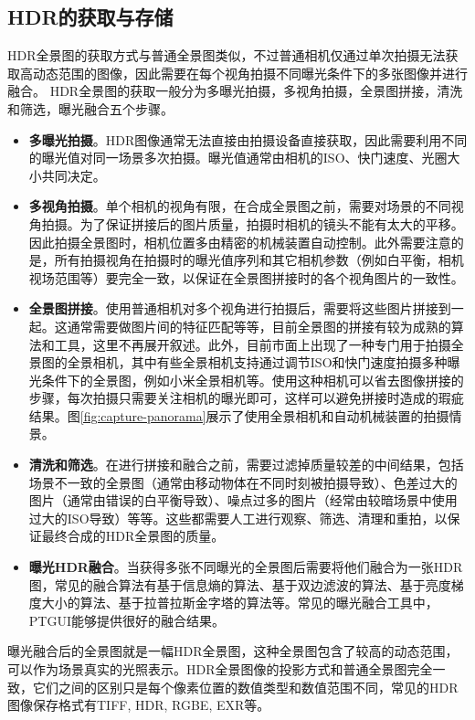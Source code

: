 \subsection{HDR的获取与存储}
HDR全景图的获取方式与普通全景图类似，不过普通相机仅通过单次拍摄无法获取高动态范围的图像，因此需要在每个视角拍摄不同曝光条件下的多张图像并进行融合。
HDR全景图的获取一般分为多曝光拍摄，多视角拍摄，全景图拼接，清洗和筛选，曝光融合五个步骤。
\begin{itemize}
    \item \textbf{多曝光拍摄}。HDR图像通常无法直接由拍摄设备直接获取，因此需要利用不同的曝光值对同一场景多次拍摄。曝光值通常由相机的ISO、快门速度、光圈大小共同决定。
    \item \textbf{多视角拍摄}。单个相机的视角有限，在合成全景图之前，需要对场景的不同视角拍摄。为了保证拼接后的图片质量，拍摄时相机的镜头不能有太大的平移。因此拍摄全景图时，相机位置多由精密的机械装置自动控制。此外需要注意的是，所有拍摄视角在拍摄时的曝光值序列和其它相机参数（例如白平衡，相机视场范围等）要完全一致，以保证在全景图拼接时的各个视角图片的一致性。
    \item \textbf{全景图拼接}。使用普通相机对多个视角进行拍摄后，需要将这些图片拼接到一起。这通常需要做图片间的特征匹配等等，目前全景图的拼接有较为成熟的算法和工具，这里不再展开叙述。此外，目前市面上出现了一种专门用于拍摄全景图的全景相机，其中有些全景相机支持通过调节ISO和快门速度拍摄多种曝光条件下的全景图，例如小米全景相机\cite{xiaomi}等。使用这种相机可以省去图像拼接的步骤，每次拍摄只需要关注相机的曝光即可，这样可以避免拼接时造成的瑕疵结果。图\ref{fig:capture-panorama}展示了使用全景相机和自动机械装置的拍摄情景。
    \item \textbf{清洗和筛选}。在进行拼接和融合之前，需要过滤掉质量较差的中间结果，包括场景不一致的全景图（通常由移动物体在不同时刻被拍摄导致）、色差过大的图片（通常由错误的白平衡导致）、噪点过多的图片（经常由较暗场景中使用过大的ISO导致）等等。这些都需要人工进行观察、筛选、清理和重拍，以保证最终合成的HDR全景图的质量。
    \item \textbf{曝光HDR融合}。当获得多张不同曝光的全景图后需要将他们融合为一张HDR图，常见的融合算法有基于信息熵的算法、基于双边滤波的算法、基于亮度梯度大小的算法、基于拉普拉斯金字塔的算法等。常见的曝光融合工具中，PTGUI\cite{ptgui}能够提供很好的融合结果。
\end{itemize}



曝光融合后的全景图就是一幅HDR全景图，这种全景图包含了较高的动态范围，可以作为场景真实的光照表示。HDR全景图像的投影方式和普通全景图完全一致，它们之间的区别只是每个像素位置的数值类型和数值范围不同，常见的HDR图像保存格式有TIFF, HDR, RGBE, EXR等。

